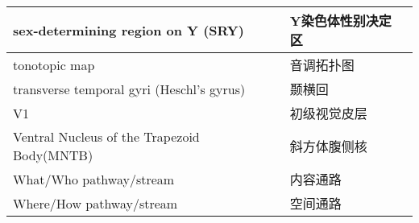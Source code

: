 \begin{table}[htbp]
{\begin{tabular}{llll}
		\midrule
		sex-determining region on Y (SRY)   && Y染色体性别决定区 \\
		
		\midrule
		tonotopic map   && 音调拓扑图  \\
		
		\midrule
		transverse temporal gyri (Heschl's gyrus)   && 颞横回  \\
		
		\midrule
		V1   && 初级视觉皮层  \\
		
		\midrule
		Ventral Nucleus of the Trapezoid Body(MNTB)   && 斜方体腹侧核  \\
		
		\midrule
		What/Who pathway/stream  && 内容通路  \\
		
		\midrule
		Where/How pathway/stream && 空间通路  \\
		
		
		\bottomrule  

	\end{tabular}}
\end{table}%

